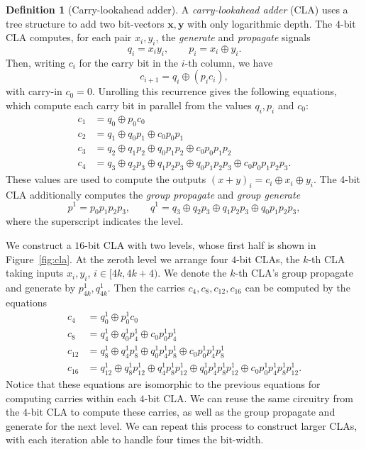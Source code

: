 \documentclass[11pt]{article}
\theoremstyle{definition}
\newtheorem{definition}[theorem]{Definition}
\theoremstyle{remark}
\newcommand{\vv}[1]{\mathbf{#1}}
\begin{document}
\begin{definition}[Carry-lookahead adder]
\label{def:cla}
A \emph{carry-lookahead adder} (CLA) uses a tree structure to add two bit-vectors $\vv{x},\vv{y}$ with only logarithmic depth. The
$4$-bit CLA computes, for each pair $x_i,y_i$, the \emph{generate} and \emph{propagate} signals
\[
q_i=x_iy_i,
\qquad
p_i=x_i\oplus y_i.
\]
Then, writing $c_i$ for the carry bit in the $i$-th column, we have
\[
c_{i+1}=q_i\oplus(p_ic_i),
\]
with carry-in $c_0=0$. Unrolling this recurrence gives the following equations, which compute each carry bit in parallel
from the values $q_i,p_i$ and $c_0$:
\begin{align*}
c_1&=q_0\oplus p_0c_0\\
c_2&=q_1\oplus q_0p_1\oplus c_0p_0p_1\\
c_3&=q_2\oplus q_1p_2\oplus q_0p_1p_2\oplus c_0p_0p_1p_2\\
c_4&=q_3\oplus q_2p_3\oplus q_1p_2p_3\oplus q_0p_1p_2p_3\oplus c_0p_0p_1p_2p_3.
\end{align*}
These values are used to compute the outputs $(x+y)_i=c_i\oplus x_i\oplus y_i$. The $4$-bit CLA additionally computes the
\emph{group propagate} and \emph{group generate}
\[
p^1=p_0p_1p_2p_3,
\qquad
q^1=q_3\oplus q_2p_3\oplus q_1p_2p_3\oplus q_0p_1p_2p_3,
\]
where the superscript indicates the level.

We construct a $16$-bit CLA with two levels, whose first half is shown in Figure~\ref{fig:cla}. At the zeroth level we arrange
four $4$-bit CLAs, the $k$-th CLA taking inputs $x_i,y_i$, $i\in[4k,4k+4)$. We denote the $k$-th CLA's group propagate and
generate by $p^1_{4k},q^1_{4k}$. Then the carries $c_4,c_8,c_{12},c_{16}$ can be computed by the equations
\begin{align*}
c_4&=q^1_0\oplus p^1_0c_0\\
c_8&=q^1_4\oplus q^1_0p^1_4\oplus c_0p^1_0p^1_4\\
c_{12}&=q^1_8\oplus q^1_4p^1_8\oplus q^1_0p^1_4p^1_8\oplus c_0p^1_0p^1_4p^1_8\\
c_{16}&=q^1_{12}\oplus q^1_8p^1_{12}\oplus q^1_4p^1_8p^1_{12}\oplus q^1_0p^1_4p^1_8p^1_{12}\oplus c_0p^1_0p^1_4p^1_8p^1_{12}.
\end{align*}
Notice that these equations are isomorphic to the previous equations for computing carries within each $4$-bit CLA. We can reuse
the same circuitry from the $4$-bit CLA to compute these carries, as well as the group propagate and generate for the next level.
We can repeat this process to construct larger CLAs, with each iteration able to handle four times the bit-width.
\end{definition}
\end{document}
